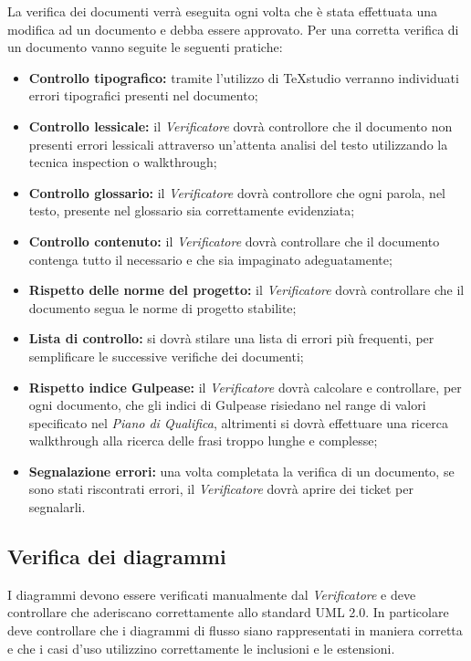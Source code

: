 La verifica dei documenti verrà eseguita ogni volta che è stata effettuata una modifica ad un documento e debba essere approvato.
Per una corretta verifica di un documento vanno seguite le seguenti pratiche:

\begin{itemize}
	\item \textbf{Controllo tipografico: }tramite l'utilizzo di TeXstudio verranno individuati errori tipografici presenti nel documento;
	\item \textbf{Controllo lessicale: }il \textit{Verificatore} dovrà controllore che il documento non presenti errori lessicali attraverso un'attenta analisi del testo utilizzando la tecnica inspection o walkthrough;
	\item \textbf{Controllo glossario: }il \textit{Verificatore} dovrà controllore che ogni parola, nel testo, presente nel glossario sia correttamente evidenziata;
	\item \textbf{Controllo contenuto: }il \textit{Verificatore} dovrà controllare che il documento contenga tutto il necessario e che sia impaginato adeguatamente;
	\item \textbf{Rispetto delle norme del progetto: }il \textit{Verificatore} dovrà controllare che il documento segua le norme di progetto stabilite;
	\item \textbf{Lista di controllo: }si dovrà stilare una lista di errori più frequenti, per semplificare le successive verifiche dei documenti;
	\item \textbf{Rispetto indice Gulpease: }il \textit{Verificatore} dovrà calcolare e controllare, per ogni documento, che gli indici di Gulpease risiedano nel range di valori specificato nel \textit{Piano di Qualifica}, altrimenti si dovrà effettuare una ricerca walkthrough alla ricerca delle frasi troppo lunghe e complesse;
	\item \textbf{Segnalazione errori: }una volta completata la verifica di un documento, se sono stati riscontrati errori, il \textit{Verificatore} dovrà aprire dei ticket per segnalarli.
\end{itemize}

\subsection{Verifica dei diagrammi}

I diagrammi devono essere verificati manualmente dal \textit{Verificatore} e deve controllare che aderiscano correttamente allo standard UML 2.0.
In particolare deve controllare che i diagrammi di flusso siano rappresentati in maniera corretta e che i casi d'uso utilizzino correttamente le inclusioni e le estensioni.